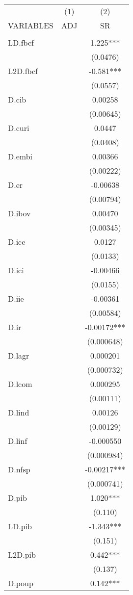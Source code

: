 \begin{tabular}{lcc} \hline
 & (1) & (2) \\
VARIABLES & ADJ & SR \\ \hline
 &  &  \\
LD.fbcf &  & 1.225*** \\
 &  & (0.0476) \\
L2D.fbcf &  & -0.581*** \\
 &  & (0.0557) \\
D.cib &  & 0.00258 \\
 &  & (0.00645) \\
D.curi &  & 0.0447 \\
 &  & (0.0408) \\
D.embi &  & 0.00366 \\
 &  & (0.00222) \\
D.er &  & -0.00638 \\
 &  & (0.00794) \\
D.ibov &  & 0.00470 \\
 &  & (0.00345) \\
D.ice &  & 0.0127 \\
 &  & (0.0133) \\
D.ici &  & -0.00466 \\
 &  & (0.0155) \\
D.iie &  & -0.00361 \\
 &  & (0.00584) \\
D.ir &  & -0.00172*** \\
 &  & (0.000648) \\
D.lagr &  & 0.000201 \\
 &  & (0.000732) \\
D.lcom &  & 0.000295 \\
 &  & (0.00111) \\
D.lind &  & 0.00126 \\
 &  & (0.00129) \\
D.linf &  & -0.000550 \\
 &  & (0.000984) \\
D.nfsp &  & -0.00217*** \\
 &  & (0.000741) \\
D.pib &  & 1.020*** \\
 &  & (0.110) \\
LD.pib &  & -1.343*** \\
 &  & (0.151) \\
L2D.pib &  & 0.442*** \\
 &  & (0.137) \\
D.poup &  & 0.142*** \\

\end{tabular}
